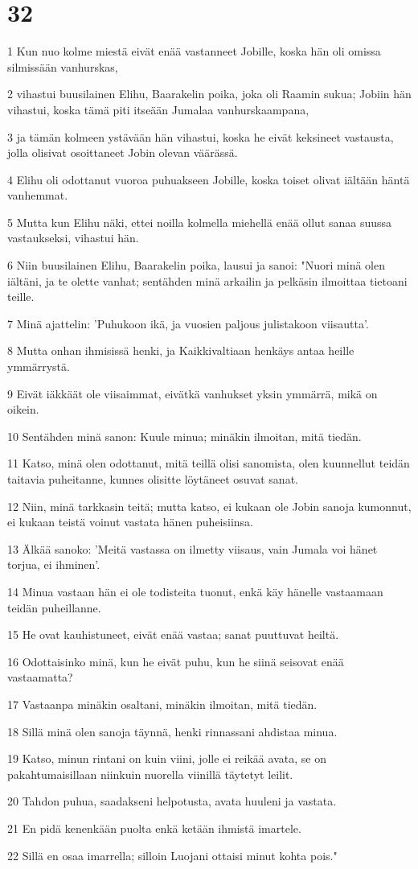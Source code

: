 \chapter{32}

\par 1 Kun nuo kolme miestä eivät enää vastanneet Jobille, koska hän oli omissa silmissään vanhurskas,
\par 2 vihastui buusilainen Elihu, Baarakelin poika, joka oli Raamin sukua; Jobiin hän vihastui, koska tämä piti itseään Jumalaa vanhurskaampana,
\par 3 ja tämän kolmeen ystävään hän vihastui, koska he eivät keksineet vastausta, jolla olisivat osoittaneet Jobin olevan väärässä.
\par 4 Elihu oli odottanut vuoroa puhuakseen Jobille, koska toiset olivat iältään häntä vanhemmat.
\par 5 Mutta kun Elihu näki, ettei noilla kolmella miehellä enää ollut sanaa suussa vastaukseksi, vihastui hän.
\par 6 Niin buusilainen Elihu, Baarakelin poika, lausui ja sanoi: "Nuori minä olen iältäni, ja te olette vanhat; sentähden minä arkailin ja pelkäsin ilmoittaa tietoani teille.
\par 7 Minä ajattelin: 'Puhukoon ikä, ja vuosien paljous julistakoon viisautta'.
\par 8 Mutta onhan ihmisissä henki, ja Kaikkivaltiaan henkäys antaa heille ymmärrystä.
\par 9 Eivät iäkkäät ole viisaimmat, eivätkä vanhukset yksin ymmärrä, mikä on oikein.
\par 10 Sentähden minä sanon: Kuule minua; minäkin ilmoitan, mitä tiedän.
\par 11 Katso, minä olen odottanut, mitä teillä olisi sanomista, olen kuunnellut teidän taitavia puheitanne, kunnes olisitte löytäneet osuvat sanat.
\par 12 Niin, minä tarkkasin teitä; mutta katso, ei kukaan ole Jobin sanoja kumonnut, ei kukaan teistä voinut vastata hänen puheisiinsa.
\par 13 Älkää sanoko: 'Meitä vastassa on ilmetty viisaus, vain Jumala voi hänet torjua, ei ihminen'.
\par 14 Minua vastaan hän ei ole todisteita tuonut, enkä käy hänelle vastaamaan teidän puheillanne.
\par 15 He ovat kauhistuneet, eivät enää vastaa; sanat puuttuvat heiltä.
\par 16 Odottaisinko minä, kun he eivät puhu, kun he siinä seisovat enää vastaamatta?
\par 17 Vastaanpa minäkin osaltani, minäkin ilmoitan, mitä tiedän.
\par 18 Sillä minä olen sanoja täynnä, henki rinnassani ahdistaa minua.
\par 19 Katso, minun rintani on kuin viini, jolle ei reikää avata, se on pakahtumaisillaan niinkuin nuorella viinillä täytetyt leilit.
\par 20 Tahdon puhua, saadakseni helpotusta, avata huuleni ja vastata.
\par 21 En pidä kenenkään puolta enkä ketään ihmistä imartele.
\par 22 Sillä en osaa imarrella; silloin Luojani ottaisi minut kohta pois."

